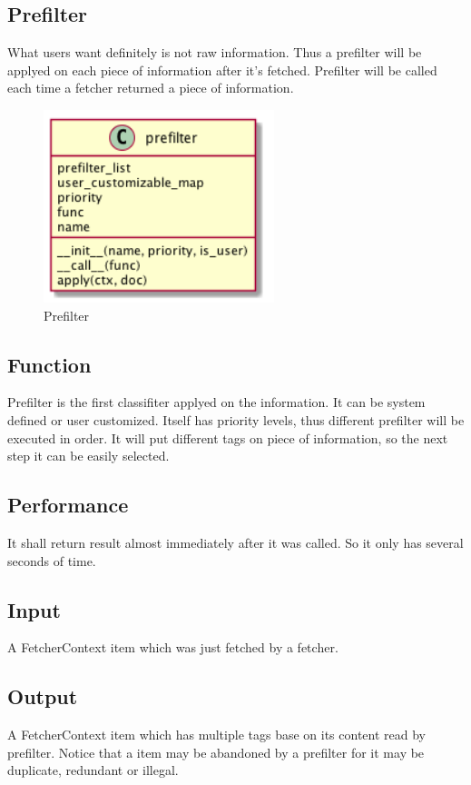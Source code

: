 
\subsection{Prefilter}
  What users want definitely is not raw information. Thus a prefilter will be applyed on each piece of information after it's fetched.
  Prefilter will be called each time a fetcher returned a piece of information.
  \begin{figure}[H]
    \centering
    \includegraphics[width=0.6\textwidth]{img/prefilter.png}
    \caption{Prefilter\label{fig:prefilter}}
  \end{figure}

  \subsection{Function}
    Prefilter is the first classifiter applyed on the information. It can be system defined or user customized.
    Itself has priority levels, thus different prefilter will be executed in order.
    It will put different tags on piece of information, so the next step it can be easily selected.

  \subsection{Performance}
    It shall return result almost immediately after it was called. So it only has several seconds of time.

  \subsection{Input}
    A FetcherContext item which was just fetched by a fetcher.

  \subsection{Output}
    A FetcherContext item which has multiple tags base on its content read by prefilter.
    Notice that a item may be abandoned by a prefilter for it may be duplicate, redundant or illegal.

